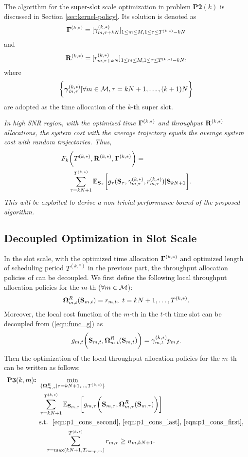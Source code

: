 The  algorithm for the super-slot scale optimization in problem \textbf{P2$(k)$} is discussed in Section \ref{sec:kernel-policy}.
Its solution is denoted as
$$\mathbf{\Gamma}^{(k,*)}=[\gamma^{(k,*)}_{m,\tau+kN}]_{1 \leq m \leq M, 1 \leq \tau \leq T^{(k,*)}-kN}$$
and
$$\mathbf{R}^{(k,*)}=[r^{(k,*)}_{m,\tau+kN}]_{1 \leq m \leq M, 1 \leq \tau \leq T^{(k,*)}-kN},$$
where $$\bigg\{ \boldsymbol{\gamma}^{(k,*)}_{m,\tau} | \forall m\in\mathcal{M}, \tau=kN+1,\dots,(k+1)N \bigg\}$$ are adopted as the time allocation of the $k$-th super slot.


 {\it In high SNR region, with the optimized time $\mathbf{\Gamma}^{(k,*)}$ and throughput $\mathbf{R}^{(k,*)}$ allocations, the system cost with the average trajectory equals the average system cost with random trajectories. Thus,
\begin{align*}
F_k &\bigg( T^{(k,*)}, \mathbf{R}^{(k,*)}, \mathbf{\Gamma}^{(k,*)}\bigg) =
\nonumber\\
&\sum_{\tau=kN+1}^{T^{(k,*)}} \mathbb{E}_{\mathbf{S}_{\tau}} \bigg[
            g_{\tau}( \mathbf{S}_{\tau}, \gamma^{(k,*)}_{m,\tau}, r^{(k,*)}_{m,\tau}) | \mathbf{S}_{kN+1}
        \bigg].
\end{align*}
This will be exploited to derive a non-trivial performance bound of the proposed algorithm.}

\subsection{Decoupled Optimization in Slot Scale}
In the slot scale, with the optimized time allocation $\mathbf{\Gamma}^{(k,*)}$ and optimized length of scheduling period $T^{(k,*)}$ in the previous part, the throughput allocation policies of {\IAVs} can be decoupled. We first define the following local throughput allocation policies for the $m$-th {\IAV} ($\forall m\in\mathcal{M}$):
\begin{align}
    \boldsymbol{\Omega}^{R}_{m,t}( \mathbf{S}_{m,t} ) = r_{m,t},~t=kN+1,\dots,T^{(k,*)}.
\end{align}
Moreover, the local cost function of the $m$-th {\IAV} in the $t$-th time slot can be decoupled from (\ref{eqn:func_g})  as
\begin{align}
    g_{m,t}\bigg( \mathbf{S}_{m,t}, \boldsymbol{\Omega}^{R}_{m,t}(\mathbf{S}_{m,t}) \bigg) = \gamma^{(k,*)}_{m,t} p_{m,t}.
\end{align}
Then the optimization of the local throughput allocation policies for the $m$-th {\IAV} can be written as follows:
\begin{align}
    \textbf{P3$(k,m)$:~}
    &\min_{ \{\boldsymbol{\Omega}^{R}_{m,\tau} | \tau=kN+1,\dots,T^{(k,*)} \} }
        \nonumber\\
        &\sum_{\tau=kN+1}^{T^{(k,*)}}
        \mathbb{E}_{\mathbf{S}_{m,\tau}} \bigg[
            g_{m,\tau}\bigg( \mathbf{S}_{m,\tau}, \boldsymbol{\Omega}^{R}_{m,\tau}( \mathbf{S}_{m,\tau} ) \bigg)\nonumber
        \bigg]
    \\\nonumber
    &\text{s.t.~} \text{ \eqref{eqn:p1_cons_second}, \eqref{eqn:p1_cons_last}, \eqref{eqn:p1_cons_first}, } \nonumber\\
    & ~~~ \sum_{ \tau=\max(kN+1,T_{\text{comp},m}) }^{ T^{(k,*)}} r_{m,\tau} \geq {u}_{m,kN+1}.
\end{align}

